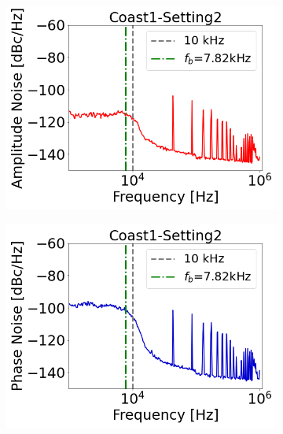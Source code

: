  \begin{figure}[!ht]
   \centering
   \begin{subfigure}[t]{0.45\textwidth}
       \centering
       \includegraphics[width=1\textwidth]{images/Ch5/Measured_spectrum_MD5_Coast1-Setting2-AN.csv_no_psd.png}
   \end{subfigure}
   \hfill
   \begin{subfigure}[t]{0.45\textwidth}
       \centering
       \includegraphics[width=1\textwidth]{images/Ch5/Measured_spectrum_MD5_Coast1-Setting2-PN.csv_no_psd.png}

\end{subfigure}
\end{figure}
